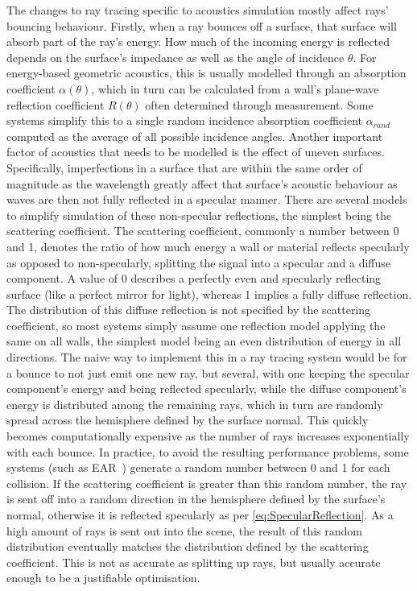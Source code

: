The changes to ray tracing specific to acoustics simulation mostly affect rays' bouncing behaviour.
Firstly, when a ray bounces off a surface,
that surface will absorb part of the ray's energy.
How much of the incoming energy is reflected depends on the surface's impedance
as well as the angle of incidence \(\theta\).
\newline
For energy-based geometric acoustics, this is usually modelled through an absorption coefficient \(\alpha(\theta)\),
which in turn can be calculated from a wall's plane-wave reflection coefficient \(R(\theta)\) often determined through measurement.
Some systems simplify this to a single random incidence absorption coefficient \(\alpha_{rand}\)
computed as the average of all possible incidence angles.
\newline
Another important factor of acoustics that needs to be modelled is the effect of uneven surfaces.
Specifically, imperfections in a surface that are within the same order of magnitude as the wavelength greatly affect that surface's acoustic behaviour
as waves are then not fully reflected in a specular manner.
There are several models to simplify simulation of these non-specular reflections,
the simplest being the scattering coefficient.
\newline
The scattering coefficient, commonly a number between 0 and 1,
denotes the ratio of how much energy a wall or material reflects specularly as opposed to non-specularly,
splitting the signal into a specular and a diffuse component.
A value of 0 describes a perfectly even and specularly reflecting surface (like a perfect mirror for light),
whereas 1 implies a fully diffuse reflection.
\newline
The distribution of this diffuse reflection is not specified by the scattering coefficient,
so most systems simply assume one reflection model applying the same on all walls,
the simplest model being an even distribution of energy in all directions.
\newline
The naive way to implement this in a ray tracing system would be for a bounce to not just emit one new ray, but several,
with one keeping the specular component's energy and being reflected specularly,
while the diffuse component's energy is distributed among the remaining rays,
which in turn are randomly spread across the hemisphere defined by the surface normal.
This quickly becomes computationally expensive as the number of rays increases exponentially with each bounce.
\newline
In practice, to avoid the resulting performance problems,
some systems (such as EAR~\cite{Kr17}) generate a random number between 0 and 1 for each collision.
If the scattering coefficient is greater than this random number,
the ray is sent off into a random direction in the hemisphere defined by the surface's normal,
otherwise it is reflected specularly as per \ref{eq:SpecularReflection}.
As a high amount of rays is sent out into the scene,
the result of this random distribution eventually matches the distribution defined by the scattering coefficient.
This is not as accurate as splitting up rays,
but usually accurate enough to be a justifiable optimisation.
